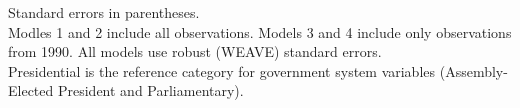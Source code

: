 \documentclass[a4paper]{article}\usepackage{graphicx, color}
\begin{document}
\begin{table}
\begin{center}
\end{center}
{\scriptsize{
	Standard errors in parentheses. \\
	Modles 1 and 2 include all observations. Models 3 and 4 include only observations from 1990.
	All models use robust (WEAVE) standard errors. \\
    Presidential is the reference category for government system variables (Assembly-Elected President and Parliamentary). \\
}}
\end{table}

\end{document}
